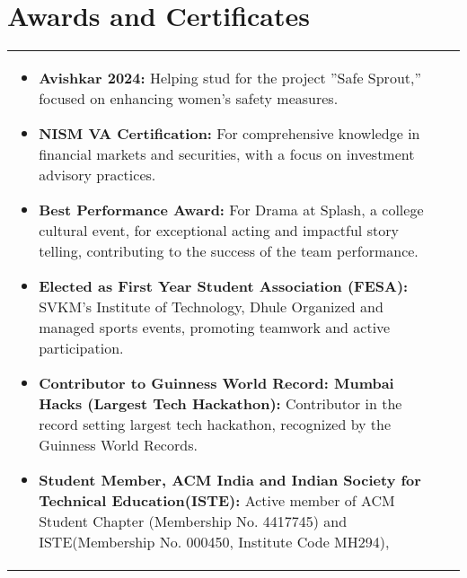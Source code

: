 \documentclass[a4paper,8pt]{article}
\begin{document}
\section{Awards and Certificates}
\begin{tabularx}{\linewidth}{ @{}l r@{} }
\begin{minipage}[t]{\linewidth}
    \begin{itemize}[nosep,after=\strut, leftmargin=2em, itemsep=2pt]
        \item \textbf{Avishkar 2024:} Helping stud for the project ”Safe Sprout,” focused on enhancing women’s safety measures.
        
        \item \textbf{NISM VA Certification:} For comprehensive knowledge in financial markets and securities, with a focus on investment advisory practices.

        \item \textbf{Best Performance Award:} For Drama at Splash, a college cultural event, for exceptional acting and impactful story telling, contributing to the success of the team performance.

        \item \textbf{Elected as First Year Student Association (FESA):} SVKM’s Institute of Technology, Dhule Organized and managed sports events, promoting teamwork and active participation.

        \item \textbf{Contributor to Guinness World Record: Mumbai Hacks (Largest Tech Hackathon):} Contributor in the record setting largest tech hackathon, recognized by the Guinness World Records.

        \item \textbf{Student Member, ACM India and Indian Society for Technical Education(ISTE):} Active member of ACM Student Chapter (Membership No. 4417745) and ISTE(Membership No. 000450, Institute Code MH294),
    \end{itemize}
\end{minipage}
\end{tabularx}
\end{document}
